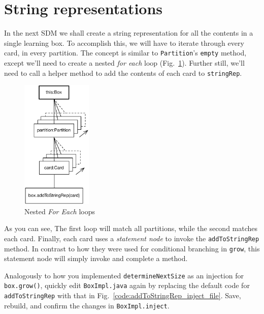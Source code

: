 \newpage
\hypertarget{sec:stringRep}{}
\section{String representations}
\genHeader

In the next SDM we shall create a string representation for all the contents in a single learning box. To accomplish this, we will have to iterate through 
every card, in every partition. The concept is similar to \texttt{Partition}'s \texttt{empty} method, except we'll need to create a nested \emph{for each}
loop (Fig.~\ref{fig:goal_stringRep}). Further still, we'll need to call a helper method to add the contents of each card to \texttt{stringRep}.

\vspace{1cm}

\begin{figure}[htbp]
	\centering
	\includegraphics[width=0.3\textwidth]{goal_stringRep.pdf}
	\caption{Nested \emph{For Each} loops}
	\label{fig:goal_stringRep}
\end{figure}

\vspace{1cm}

As you can see, The first loop will match all partitions, while the second matches each card. Finally, each card uses a \emph{statement node} to invoke the
\texttt{addToStringRep} method. In contrast to how they were used for conditional branching in \texttt{grow}, this statement node will simply invoke and
complete a method.

\vspace{0.5cm}

Analogously to how you implemented \texttt{determineNextSize} as an injection for \texttt{box.grow()}, quickly edit \texttt{BoxImpl.java} again by replacing the
default code for \texttt{addToStringRep} with that in Fig.~\ref{code:addToStringRep_inject_file}. Save, rebuild, and confirm the changes in
\texttt{BoxImpl.inject}.

